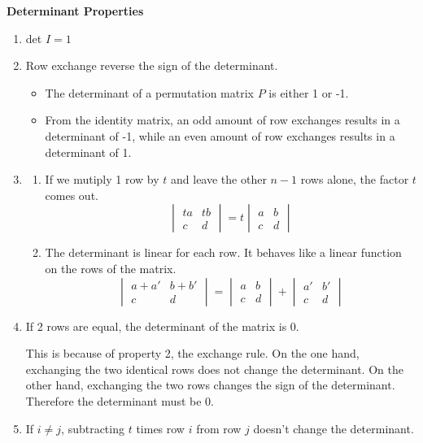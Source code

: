 \documentclass[11pt]{article}
\begin{document}
\textbf{Determinant Properties}
\begin{enumerate}
    \item det $I=1$
    \item Row exchange reverse the sign of the determinant. 
    \begin{itemize}
        \item The determinant of a permutation matrix $P$ is either 1 or -1.
        \item From the identity matrix, an odd amount of row exchanges results in a 
        determinant of -1, while an even amount of row exchanges results in a determinant of 1.
    \end{itemize}
    \item
    \begin{enumerate}
        \item If we mutiply 1 row by $t$ and leave the other $n-1$ rows alone, the factor $t$ 
        comes out.
        \[
            \begin{vmatrix}
                ta & tb \\ 
                c & d 
            \end{vmatrix} = 
            t \begin{vmatrix}
                a & b \\
                c & d
            \end{vmatrix}
        \]
        \item The determinant is linear for each row. It behaves like a linear function on the 
        rows of the matrix.
        \[
            \begin{vmatrix}
                a+a' & b+b' \\ 
                c & d 
            \end{vmatrix} = 
            \begin{vmatrix}
                a & b \\ 
                c & d 
            \end{vmatrix} +
            \begin{vmatrix}
                a' & b' \\ 
                c & d 
            \end{vmatrix} 
            \]
    \end{enumerate}
    \item If 2 rows are equal, the determinant of the matrix is 0.
    
    This is because of property 2, the exchange rule. On the one hand, exchanging the two 
    identical rows does not change the determinant. On the other hand, exchanging the two rows
    changes the sign of the determinant. Therefore the determinant must be 0. 
    \item If \(i \ne j\), subtracting $t$ times row $i$ from row $j$ doesn't change the 
    determinant.


\end{enumerate}
\end{document}
